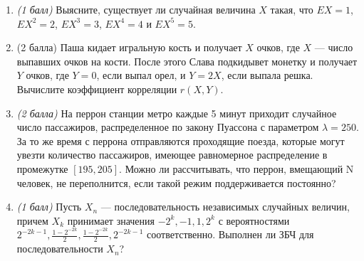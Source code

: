 \documentclass{article}
\begin{document}
\begin{enumerate}

\item \textit{(1 балл)} Выясните, существует ли случайная величина $X$ такая, что $EX = 1$, $EX^2 = 2$, $EX^3 = 3$, $EX^4 = 4$ и $EX^5 = 5$.
\item (2 балла) Паша кидает игральную кость и получает $X$ очков, где $X$ — число выпавших очков на кости. После этого Слава подкидывет монетку и получает $Y$ очков, где $Y = 0$, если выпал орел, и $Y = 2X$, если выпала решка. Вычислите коэффициент корреляции $r(X, Y)$.
\item \textit{(2 балла)} На перрон станции метро каждые 5 минут приходит случайное число пассажиров, распределенное по закону Пуассона с параметром $\lambda = 250$. За то же время с перрона отправляются проходящие поезда, которые могут увезти количество пассажиров, имеющее равномерное распределение в промежутке $[195, 205]$. Можно ли рассчитывать, что перрон, вмещающий N человек, не переполнится, если такой режим поддерживается постоянно?
\item \textit{(1 балл)} Пусть ${X_n}$ — последовательность независимых случайных величин, причем $X_k$ принимает значения $-2^k, -1, 1, 2^k$ с вероятностями $2^{-2k-1},\frac{1-2^{-2k}}{2},\frac{1-2^{-2k}}{2}, 2^{-2k-1}$ соответственно. Выполнен ли ЗБЧ для последовательности ${X_n}$?





\end{enumerate}
\end{document}
